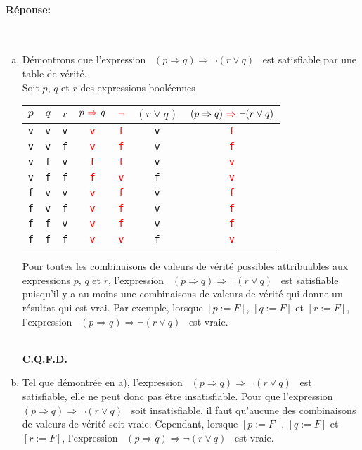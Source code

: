 \documentclass[12pt]{article}
\newcommand{\rouge}[1]{\textcolor{red}{#1}}
\newcommand{\blanc}[1]{\textcolor{white}{#1}}
\newcommand{\V}{\mbox{\tt v}}
\newcommand{\F}{\mbox{\tt f}}
\newcommand{\ou}{\vee}                   %
\newcommand{\implique}{\Rightarrow}      %
\newcommand{\cqfd}{\blanc{.}\\[-2mm]\mbox{}\hfill {\bf C.Q.F.D.}\\} %
\begin{document}
\paragraph{Réponse:}~\\

\begin{enumerate}[a)]
\item \noindent Démontrons que l'expression \guillemotleft ~$(p \implique q) \implique \neg (r \ou q)$ \guillemotright ~est satisfiable par une table de vérité.\\

\noindent Soit $p$, $q$ et $r$ des expressions booléennes\\

\begin{center}
\begin{tabular}{c c c|c|cc| c}
	$p$ & $q$ & $r$ & $p ~\rouge{\implique} ~q$ & $\rouge{\neg}$ & $(r \ou q)$ & $(p \implique q) ~\rouge{\implique} ~\neg (r \ou q)$ \\ \hline
	\V & \V & \V & \rouge{\V} & \rouge{\F} & \V & \rouge{\F}\\
	\V & \V & \F & \rouge{\V} & \rouge{\F} & \V & \rouge{\F}\\
	\V & \F & \V & \rouge{\F} & \rouge{\F} & \V & \rouge{\V}\\
	\V & \F & \F & \rouge{\F} & \rouge{\V} & \F & \rouge{\V}\\
	\F & \V & \V & \rouge{\V} & \rouge{\F} & \V & \rouge{\F}\\
	\F & \V & \F & \rouge{\V} & \rouge{\F} & \V & \rouge{\F}\\
	\F & \F & \V & \rouge{\V} & \rouge{\F} & \V & \rouge{\F}\\
	\F & \F & \F & \rouge{\V} & \rouge{\V} & \F & \rouge{\V}\\
\end{tabular}
\end{center}

\noindent Pour toutes les combinaisons de valeurs de vérité possibles attribuables aux expressions $p$, $q$ et $r$, l'expression \guillemotleft ~$(p \implique q) \implique \neg (r \ou q)$ \guillemotright ~est satisfiable puisqu'il y a au moins une combinaisons de valeurs de vérité qui donne un résultat qui est vrai. Par exemple, lorsque $[p:=F]$, $[q:=F]$ et $[r:=F]$, l'expression \guillemotleft ~$(p \implique q) \implique \neg (r \ou q)$ \guillemotright ~est vraie.

\cqfd

\item \noindent Tel que démontrée en a), l'expression \guillemotleft ~$(p \implique q) \implique \neg (r \ou q)$ \guillemotright ~est satisfiable, elle ne peut donc pas être insatisfiable. Pour que l'expression \guillemotleft ~$(p \implique q) \implique \neg (r \ou q)$ \guillemotright ~soit insatisfiable, il faut qu'aucune des combinaisons de valeurs de vérité soit vraie. Cependant, lorsque $[p:=F]$, $[q:=F]$ et $[r:=F]$, l'expression \guillemotleft ~$(p \implique q) \implique \neg (r \ou q)$ \guillemotright ~est vraie.\\


\end{enumerate}
\end{document}
